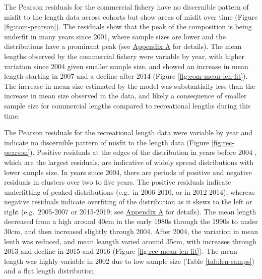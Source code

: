 \documentclass[11pt,
  english,
  a4paper,
]{article}
\begin{document}
The Pearson residuals for the commercial fishery have no discernible pattern of misfit to the length data across cohorts but show areas of misfit over time (Figure \ref{fig:com-pearson}). The residuals show that the peak of the composition is being underfit in many years since 2001, where sample sizes are lower and the distributions have a prominant peak (see {\protect\hyperlink{append_a}{Appendix A}\leavevmode\tagmcend\tagstructend} for details). The mean lengths observed by the commercial fishery were variable by year, with higher variation since 2004 given smaller sample size, and showed an increase in mean length starting in 2007 and a decline after 2014 (Figure \ref{fig:com-mean-len-fit}). The increase in mean size estimated by the model was substantially less than the increase in mean size observed in the data, and likely a consequence of smaller sample size for commercial lengths compared to recreational lengths during this time.

\leavevmode\tagmcend\tagstructend\par


The Pearson residuals for the recreational length data were variable by year and indicate no discernible pattern of misfit to the length data (Figure \ref{fig:rec-pearson}). Positive residuals at the edges of the distribution in years before 2004 , which are the largest residuals, are indicative of widely spread distributions with lower sample size. In years since 2004, there are periods of positive and negative residuals in clusters over two to five years. The positive residuals indicate underfitting of peaked distributions (e.g.~in 2006-2010, or in 2012-2014), whereas negative residuals indicate overfiting of the distribution as it skews to the left or right (e.g.~2005-2007 or 2015-2019; see {\protect\hyperlink{append_a}{Appendix A}\leavevmode\tagmcend\tagstructend} for details). The mean length decreased from a high around 40cm in the early 1980s through the 1990s to under 30cm, and then increased slightly through 2004. After 2004, the variation in mean lenth was reduced, and mean leangth varied around 35cm, with increases through 2013 and decline in 2015 and 2016 (Figure \ref{fig:rec-mean-len-fit}). The mean length was highly variable in 2002 due to low sample size (Table \ref{tab:len-samps}) and a flat length distribution.

\leavevmode\tagmcend\tagstructend\par
\end{document}
